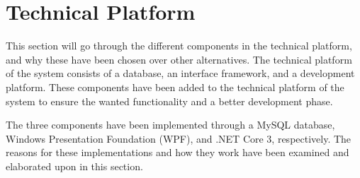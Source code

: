 \section{Technical Platform} \label{sc:tech_intro}
This section will go through the different components in the technical platform, and why these have been chosen over other alternatives. The technical platform of the system consists of a database, an interface framework, and a development platform. These components have been added to the technical platform of the system to ensure the wanted functionality and a better development phase.
\par
The three components have been implemented through a MySQL database, Windows Presentation Foundation (WPF), and .NET Core 3, respectively. The reasons for these implementations and how they work have been examined and elaborated upon in this section.